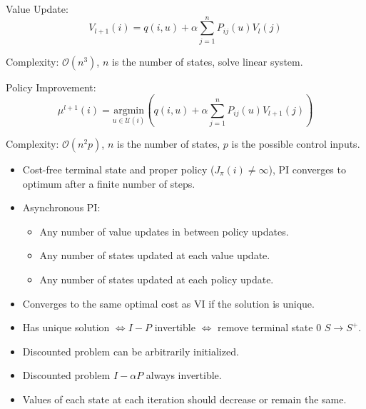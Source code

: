 \documentclass[landscape,a0paper,fontscale=0.285]{baposter} %
\newcommand{\compresslist}{ %
\setlength{\itemsep}{1pt}
\setlength{\parskip}{0pt}
\setlength{\parsep}{0pt}
}
\begin{document}
\begin{poster}
{\colorbox[HTML]{CCFFFF}{}
\begin{minipage}{0.5\textwidth}
    Value Update:\vspace{-0.3cm}
\[
V_{l+1}(i) = q(i,u) + \alpha \sum_{j=1}^n P_{ij}(u)V_l(j)
\]

Complexity: \(\mathcal{O}(n^3)\), \(n\) is the number of states, solve linear system.

\end{minipage}\hfill
\begin{minipage}{0.475\textwidth}
    Policy Improvement:\vspace{-0.3cm}
\[
\mu^{l+1}(i) = \underset{u \in \mathcal{U}(i)}{\text{argmin}} \left(q(i,u) + \alpha \sum_{j=1}^n P_{ij}(u) V_{l+1}(j)\right)
\]

Complexity: \(\mathcal{O}(n^2p)\), \(n\) is the number of states, \(p\) is the possible control inputs.
\end{minipage}


\begin{itemize}\compresslist
  \item Cost-free terminal state and proper policy (\(J_\pi(i) \neq \infty\)), PI converges to optimum after a finite number of steps.
  \item Asynchronous PI:
    \begin{itemize}[label=$\circ$]\compresslist
      \item Any number of value updates in between policy updates.
      \item Any number of states updated at each value update.
      \item Any number of states updated at each policy update.
    \end{itemize}
  \item Converges to the same optimal cost as VI if the solution is unique.
  \item Has unique solution \(\Leftrightarrow I - P\) invertible \(\Leftrightarrow\) remove terminal state \(0\) \(S \to S^+\).
  \item Discounted problem can be arbitrarily initialized.
  \item Discounted problem \(I - \alpha P\) always invertible.
  \item Values of each state at each iteration should decrease or remain the same.
\end{itemize}




}


\end{poster}
\newpage
\end{document}
